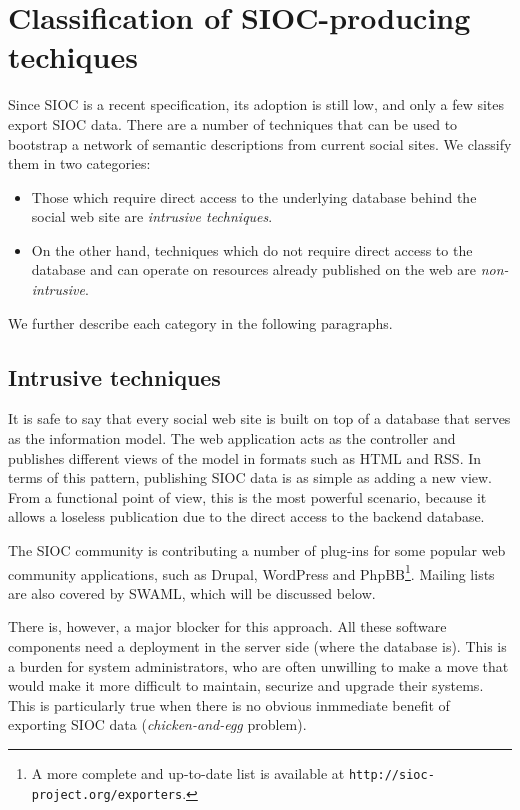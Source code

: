 \documentclass{../templates/www2008-submission}
\begin{document}
\section{Classification of SIOC-producing techiques}

Since SIOC is a recent specification, its adoption is still low, and
only a few sites export SIOC data. There are a number of techniques
that can be used to bootstrap a network of semantic descriptions from
current social sites. We classify them in two categories:

\begin{itemize}
\item Those which require direct access to the underlying database behind
the social web site are \emph{intrusive techniques}.
\item On the other hand, techniques which do not require direct access to
the database and can operate on resources already published on the web
are \emph{non-intrusive}.
\end{itemize}

We further describe each category in the following paragraphs.

\subsection{Intrusive techniques}

It is safe to say that every social web site is built on top of a
database that serves as the information model. The web application
acts as the controller and publishes different views of the model in
formats such as HTML and RSS. In terms of this pattern, publishing
SIOC data is as simple as adding a new view.
From a functional point of view, this is the most powerful scenario, because
it allows a loseless publication due to the direct access
to the backend database.

The SIOC community is contributing a number of plug-ins for some
popular web community applications, such as Drupal, WordPress and 
PhpBB\footnote{A more complete and up-to-date list is available
at \texttt{http://sioc-project.org/exporters}.}. Mailing lists are
also covered by SWAML, which will be discussed below.

There is, however, a major blocker for this approach. All these
software components need a deployment in the server side (where
the database is). This is a burden for system administrators, who
are often unwilling to make a move that would make it more difficult to
maintain, securize and upgrade their systems. This is particularly
true when there is no obvious inmmediate benefit of exporting
SIOC data (\emph{chicken-and-egg} problem).
\end{document}

